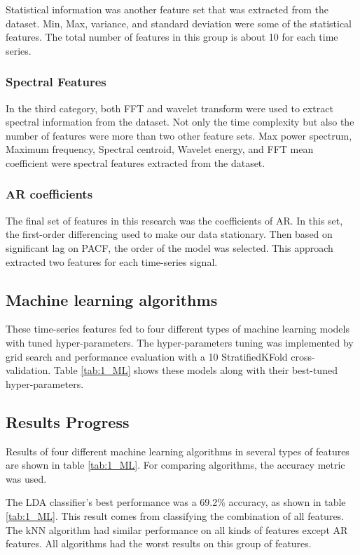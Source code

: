 Statistical information was another feature set that was extracted from the dataset. Min, Max, variance, and standard deviation were some of the statistical features. The total number of features in this group is about 10 for each time series.  

\subsubsection{Spectral Features}

In the third category, both FFT and wavelet transform were used to extract spectral information from the dataset. Not only the time complexity but also the number of features were more than two other feature sets. 
Max power spectrum, Maximum frequency, Spectral centroid, Wavelet energy, and FFT mean coefficient were spectral features extracted from the dataset.

\subsubsection{\Gls{AR} coefficients}

The final set of features in this research was the coefficients of \gls{AR}. In this set, the first-order differencing used to make our data stationary. Then based on significant lag on \gls{PACF}, the order of the model  was selected. This approach extracted two features for each time-series signal.

\subsection{Machine learning algorithms}

These time-series features fed to four different types of machine learning models with tuned hyper-parameters. The hyper-parameters tuning was implemented by grid search and performance evaluation with a 10  StratifiedKFold cross-validation. Table \ref{tab:1_ML} shows these models along with their best-tuned hyper-parameters.

\subsection{Results Progress}

Results of four different machine learning algorithms in several types of features are shown in table \ref{tab:1_ML}. For comparing algorithms, the accuracy metric was used. 
 
The LDA classifier’s best performance was a 69.2\% accuracy, as shown in table \ref{tab:1_ML}. This result comes from classifying the combination of all features. 
The kNN algorithm had similar performance on all kinds of features except \gls{AR} features. All algorithms had the worst results on this group of features.

